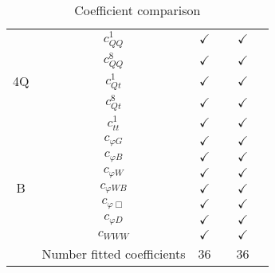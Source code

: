 \documentclass{article}
\begin{document}
\begin{table}[H]
\begin{tabular}{|c|c|c|c|c|c|}
\multirow{5}{*}{4Q}
 & $c_{QQ}^{1}$ & $\checkmark$ &  & $\checkmark$ & \\ \cline{2-6}
 & $c_{QQ}^{8}$ & $\checkmark$ &  & $\checkmark$ & \\ \cline{2-6}
 & $c_{Qt}^{1}$ & $\checkmark$ &  & $\checkmark$ & \\ \cline{2-6}
 & $c_{Qt}^{8}$ & $\checkmark$ &  & $\checkmark$ & \\ \cline{2-6}
 & $c_{tt}^{1}$ & $\checkmark$ &  & $\checkmark$ & 
\\ \hline
\multirow{7}{*}{B}
 & $c_{\varphi G}$ & $\checkmark$ &  & $\checkmark$ & \\ \cline{2-6}
 & $c_{\varphi B}$ & $\checkmark$ &  & $\checkmark$ & \\ \cline{2-6}
 & $c_{\varphi W}$ & $\checkmark$ &  & $\checkmark$ & \\ \cline{2-6}
 & $c_{\varphi WB}$ & $\checkmark$ &  & $\checkmark$ & \\ \cline{2-6}
 & $c_{\varphi \Box}$ & $\checkmark$ &  & $\checkmark$ & \\ \cline{2-6}
 & $c_{\varphi D}$ & $\checkmark$ &  & $\checkmark$ & \\ \cline{2-6}
 & $c_{WWW}$ & $\checkmark$ &  & $\checkmark$ & 
\\ \hline
\hline & Number fitted coefficients & 36 &  & 36 &  \\ \hline
\end{tabular}
\caption{Coefficient comparison}
\end{table}
\end{document}
